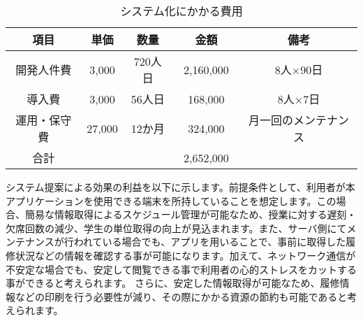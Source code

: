 
\begin{table}[htb]
  \begin{center}
    \caption{システム化にかかる費用}
    \begin{tabular}{|c|c|c|c|c|} \hline
      項目 & 単価 & 数量 & 金額　& 備考 \\ \hline \hline
      開発人件費 & 3,000 & 720人日 & 2,160,000　& 8人×90日 \\ \hline
      導入費 & 3,000 & 56人日 & 168,000 & 8人×7日 \\ \hline
      運用・保守費 & 27,000 & 12か月 & 324,000 & 月一回のメンテナンス \\ \hline
      合計 & & & 2,652,000 & \\\hline
    \end{tabular}
  \end{center}
\end{table}


システム提案による効果の利益を以下に示します。前提条件として、利用者が本アプリケーションを使用できる端末を所持していることを想定します。この場合、簡易な情報取得によるスケジュール管理が可能なため、授業に対する遅刻・欠席回数の減少、学生の単位取得の向上が見込まれます。また、サーバ側にてメンテナンスが行われている場合でも、アプリを用いることで、事前に取得した履修状況などの情報を確認する事が可能になります。加えて、ネットワーク通信が不安定な場合でも、安定して閲覧できる事で利用者の心的ストレスをカットする事ができると考えられます。
さらに、安定した情報取得が可能なため、履修情報などの印刷を行う必要性が減り、その際にかかる資源の節約も可能であると考えられます。

